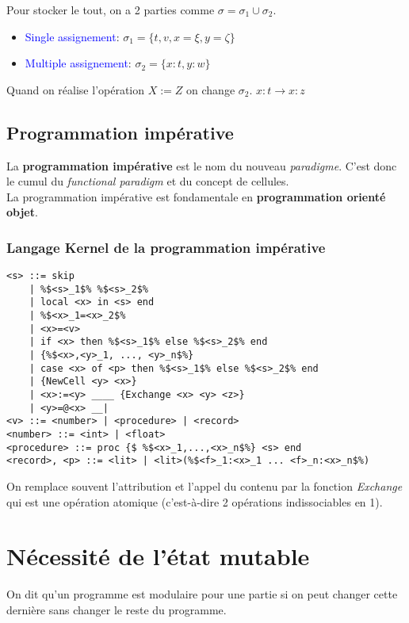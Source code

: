 \documentclass{report}
\begin{document}
Pour stocker le tout, on a 2 parties comme $\sigma = \sigma_1 \cup \sigma_2$.
\begin{itemize}
\item \textcolor{blue}{Single assignement}: $\sigma_1 = \{t,v,x=\xi,y = \zeta\}$
\item \textcolor{blue}{Multiple assignement}: $\sigma_2 = \{x:t, y:w\}$
\end{itemize}
Quand on réalise l'opération $X:=Z$ on change $\sigma_2$. $x:t \rightarrow x:z$

\subsection{Programmation impérative}
La \textbf{programmation impérative} est le nom du nouveau \textit{paradigme}. C'est donc le cumul du \textit{functional paradigm} et du concept de cellules.\\
La programmation impérative est fondamentale en \textbf{programmation orienté objet}.

\subsubsection{Langage Kernel de la programmation impérative}
\begin{lstlisting}[escapechar=\%]
<s> ::= skip 
	| %$<s>_1$% %$<s>_2$% 
	| local <x> in <s> end 
	| %$<x>_1=<x>_2$%
	| <x>=<v> 
	| if <x> then %$<s>_1$% else %$<s>_2$% end 
	| {%$<x>,<y>_1, ..., <y>_n$%} 
	| case <x> of <p> then %$<s>_1$% else %$<s>_2$% end 
	| {NewCell <y> <x>} 
	| <x>:=<y> ____ {Exchange <x> <y> <z>}
	| <y>=@<x> __|
<v> ::= <number> | <procedure> | <record> 
<number> ::= <int> | <float> 
<procedure> ::= proc {$ %$<x>_1,...,<x>_n$%} <s> end
<record>, <p> ::= <lit> | <lit>(%$<f>_1:<x>_1 ... <f>_n:<x>_n$%)
\end{lstlisting}
On remplace souvent l'attribution et l'appel du contenu par la fonction \textit{Exchange} qui est une opération atomique (c'est-à-dire 2 opérations indissociables en 1).

\section{Nécessité de l'état mutable}
On dit qu'un programme est modulaire pour une partie si on peut changer cette dernière sans changer le reste du programme.
\end{document}
